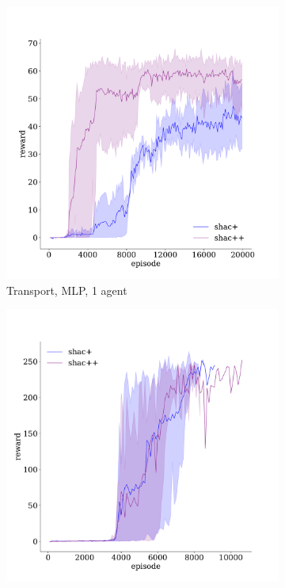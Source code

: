 \begin{figure}[!t]
    \begin{subfigure}[b]{0.32\textwidth}
        \includegraphics[width=\textwidth]{figs/transport-ablation-1-mlp.pdf}
        \caption{Transport, MLP, 1 agent}
        \label{fig:transport-ablation-mlp-1}
    \end{subfigure}
    \begin{subfigure}[b]{0.32\textwidth}
        \includegraphics[width=\textwidth]{figs/transport-ablation-3-transformer.pdf}

\end{subfigure}
\end{figure}
